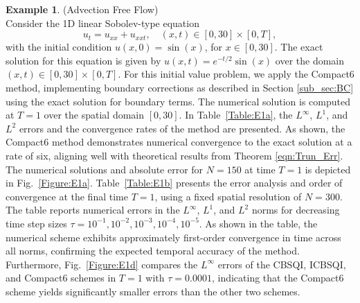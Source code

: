\documentclass[11pt,a4paper]{amsart}
\theoremstyle{plain}
\theoremstyle{definition}
\newtheorem{example}[theorem]{Example}
\theoremstyle{remark}
\numberwithin{equation}{section}
\begin{document}
\begin{example}
\normalfont
(Advection Free Flow) \\
Consider the 1D linear Sobolev-type equation
\begin{equation}\label{example:1}
    u_t = u_{xx} + u_{xxt}, \quad (x,t) \in [0,30] \times [0, T],
\end{equation}
with the initial condition $u(x,0) = \sin(x)$, for $x \in [0, 30]$. The exact solution for this equation is given by $u(x,t) = e^{-t/2}\sin(x)$ over the domain $(x,t) \in [0,30] \times [0, T]$. For this initial value problem, we apply the Compact6 method, implementing boundary corrections as described in Section \ref{sub_sec:BC} using the exact solution for boundary terms. The numerical solution is computed at $T = 1$ over the spatial domain $[0, 30]$. In Table~\ref{Table:E1a}, the $L^{\infty}$, $L^{1}$, and $L^{2}$ errors and the convergence rates of the method are presented.  As shown, the Compact6 method demonstrates numerical convergence to the exact solution at a rate of six, aligning well with theoretical results from Theorem \ref{eqn:Trun_Err}. The numerical solutions and absolute error for $N = 150$ at time $T = 1$ is depicted in Fig.~\ref{Figure:E1a}. Table~\ref{Table:E1b} presents the error analysis and order of convergence at the final time \( T = 1 \), using a fixed spatial resolution of \( N = 300 \). The table reports numerical errors in the \( L^{\infty} \), \( L^1 \), and \( L^2 \) norms for decreasing time step sizes \( \tau = 10^{-1}, 10^{-2}, 10^{-3}, 10^{-4}, 10^{-5} \). As shown in the table, the numerical scheme exhibits approximately first-order convergence in time across all norms, confirming the expected temporal accuracy of the method. Furthermore, Fig.~\ref{Figure:E1d} compares the $L^{\infty}$ errors of the CBSQI, ICBSQI, and Compact6 schemes in $T = 1$ with $\tau = 0.0001$, indicating that the Compact6 scheme yields significantly smaller errors than the other two schemes.
\par


\end{example}
\end{document}
